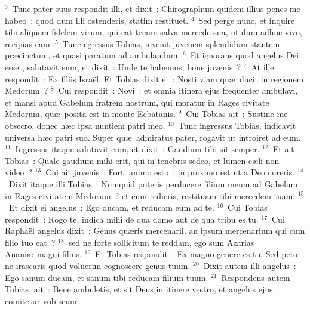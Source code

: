 ${}^{3}$~Tunc pater suus respondit illi, et dixit~: Chirographum quidem illius penes me habeo~: quod dum illi ostenderis, statim restituet.
${}^{4}$~Sed perge nunc, et inquire tibi aliquem fidelem virum, qui eat tecum salva mercede sua, ut dum adhuc vivo, recipias eam.
${}^{5}$~Tunc egressus Tobias, invenit juvenem splendidum stantem pr\ae cinctum, et quasi paratum ad ambulandum.
${}^{6}$~Et ignorans quod angelus Dei esset, salutavit eum, et dixit~: Unde te habemus, bone juvenis~?
${}^{7}$~At ille respondit~: Ex filiis Isra\"el. Et Tobias dixit ei~: Nosti viam qu\ae\ ducit in regionem Medorum~?
${}^{8}$~Cui respondit~: Novi~: et omnia itinera ejus frequenter ambulavi, et mansi apud Gabelum fratrem nostrum, qui moratur in Rages civitate Medorum, qu\ae\ posita est in monte Ecbatanis.
${}^{9}$~Cui Tobias ait~: Sustine me obsecro, donec h\ae c ipsa nuntiem patri meo.
${}^{10}$~Tunc ingressus Tobias, indicavit universa h\ae c patri suo. Super qu\ae\ admiratus pater, rogavit ut introiret ad eum.
${}^{11}$~Ingressus itaque salutavit eum, et dixit~: Gaudium tibi sit semper.
${}^{12}$~Et ait Tobias~: Quale gaudium mihi erit, qui in tenebris sedeo, et lumen c\ae li non video~?
${}^{13}$~Cui ait juvenis~: Forti animo esto~: in proximo est ut a Deo cureris.
${}^{14}$~Dixit itaque illi Tobias~: Numquid poteris perducere filium meum ad Gabelum in Rages civitatem Medorum~? et cum redieris, restituam tibi mercedem tuam.
${}^{15}$~Et dixit ei angelus~: Ego ducam, et reducam eum ad te.
${}^{16}$~Cui Tobias respondit~: Rogo te, indica mihi de qua domo aut de qua tribu es tu.
${}^{17}$~Cui Rapha\"el angelus dixit~: Genus qu\ae ris mercenarii, an ipsum mercenarium qui cum filio tuo eat~?
${}^{18}$~sed ne forte sollicitum te reddam, ego sum Azarias Anani\ae\ magni filius.
${}^{19}$~Et Tobias respondit~: Ex magno genere es tu. Sed peto ne irascaris quod voluerim cognoscere genus tuum.
${}^{20}$~Dixit autem illi angelus~: Ego sanum ducam, et sanum tibi reducam filium tuum.
${}^{21}$~Respondens autem Tobias, ait~: Bene ambuletis, et sit Deus in itinere vestro, et angelus ejus comitetur vobiscum.


